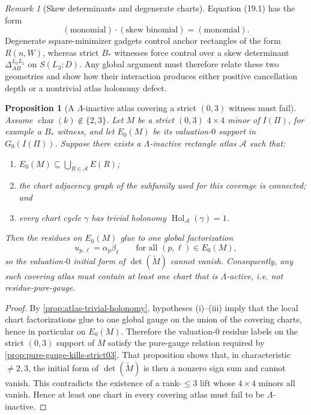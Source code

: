 \documentclass[11pt]{amsart}
\numberwithin{equation}{section}
\theoremstyle{plain}
\newtheorem{proposition}[theorem]{Proposition}
\theoremstyle{definition}
\theoremstyle{remark}
\newtheorem{remark}[theorem]{Remark}
\newcommand{\Lam}{\Lambda}
\begin{document}
\begin{remark}[Skew determinants and degenerate charts]
Equation \textup{(19.1)} has the form
\[
(\text{monomial})\cdot(\text{skew binomial})=(\text{monomial}).
\]
Degenerate square-minimizer gadgets control anchor rectangles of the form $R(n,W)$, whereas strict $B_*$ witnesses force control over a
skew determinant $\Delta_{AB}^{L_0L_1}$ on $S(L_3;D)$. Any global argument must therefore relate these two geometries and show how their interaction produces either positive cancellation depth or a nontrivial atlas holonomy defect.
\end{remark}

\begin{proposition}[A $\Lam$-inactive atlas covering a strict $(0,3)$ witness must fail]
\label{prop:atlas-forces-lam-activity}
Assume $\operatorname{char}(k)\notin\{2,3\}$. Let $M$ be a strict $(0,3)$ $4\times4$ minor of $I(\Pi)$, for example a $B_*$ witness, and let $E_0(M)$ be its valuation-$0$ support in $G_0(I(\Pi))$. Suppose there exists a $\Lam$-inactive rectangle atlas $\mathcal A$ such that:
\begin{enumerate}[leftmargin=2em,label=(\roman*)]
  \item $E_0(M)\subseteq \bigcup_{R\in\mathcal A} E(R)$;
  \item the chart adjacency graph of the subfamily used for this coverage is connected; and
  \item every chart cycle $\gamma$ has trivial holonomy $\operatorname{Hol}_{\mathcal A}(\gamma)=1$.
\end{enumerate}
Then the residues on $E_0(M)$ glue to one global factorization
\[u_{p,\ell}=\alpha_p\beta_\ell
\qquad\text{for all }(p,\ell)\in E_0(M),\]
so the valuation-$0$ initial form of $\det(\widetilde M)$ cannot vanish. Consequently, any such covering atlas must contain at least one chart that is \emph{$\Lam$-active}, i.e. not residue-pure-gauge.
\end{proposition}

\begin{proof}
By \cref{prop:atlas-trivial-holonomy}, hypotheses \textup{(i)}--\textup{(iii)} imply that the local chart factorizations glue to one global gauge on the union of the covering charts, hence in particular on $E_0(M)$. Therefore the valuation-$0$ residue labels on the strict $(0,3)$ support of $M$ satisfy the pure-gauge relation required by \cref{prop:pure-gauge-kills-strict03}. That proposition shows that, in characteristic $\neq2,3$, the initial form of $\det(\widetilde M)$ is then a nonzero sign sum and cannot vanish. This contradicts the existence of a rank-$\le3$ lift whose $4\times4$ minors all vanish. Hence at least one chart in every covering atlas must fail to be $\Lam$-inactive.
\end{proof}
\end{document}
